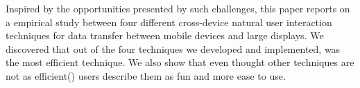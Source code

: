 Inspired by the opportunities presented by such challenges, this paper reports on a empirical study between four different cross-device natural user interaction techniques for data transfer between mobile devices and large displays.
We discovered that out of the four techniques we developed and implemented, \swipe was the most efficient technique. We also show that even thought other techniques are not as efficient(\pinch) users describe them as fun and more ease to use. 
 


